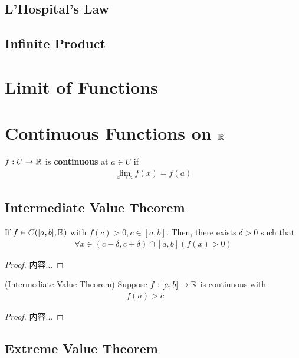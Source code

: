 \documentclass[Total.tex]{subfiles}
\begin{document}
			\subsection{L'Hospital's Law}
			
			\subsection{Infinite Product}
		\section{Limit of Functions}
		\section{Continuous Functions on $\mathbb{R}$}
			\begin{Def}
				$f:U\rightarrow \mathbb{R}$ is \textbf{continuous} at $a\in U$ if 
				\begin{gather*}
					\lim_{x\rightarrow a} f(x)=f(a)
				\end{gather*}
			\end{Def}
			
			\subsection{Intermediate Value Theorem}	
			
			\begin{lemma}
				If $f\in C([a,b],\mathbb{R})$ with $f(c)>0,c\in [a,b]$. Then, there exists $\delta>0$ such that
				\begin{gather*}
					\forall x\in (c-\delta,c+\delta)\cap [a,b](f(x)>0)
				\end{gather*}
			\end{lemma}
			\begin{proof}
				内容...
			\end{proof}
		
			
			\begin{theorem}
				(Intermediate Value Theorem) Suppose $f:[a,b]\rightarrow \mathbb{R}$ is continuous with 
				\begin{gather*}
					f(a)>c\qquad 
				\end{gather*}
			\end{theorem}
			\begin{proof}
				内容...
			\end{proof}
			
			\subsection{Extreme Value Theorem}
\end{document}
